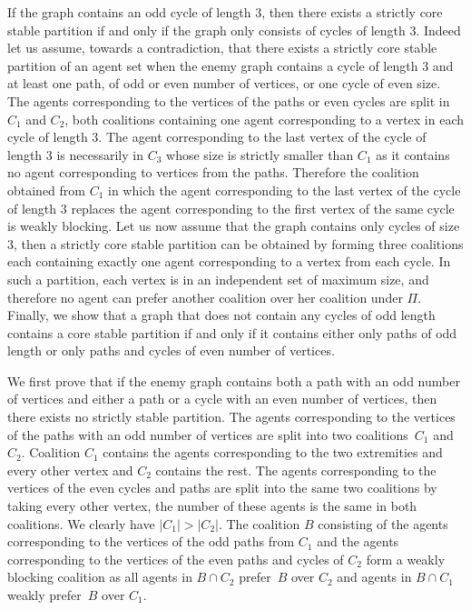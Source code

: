 \documentclass[a4paper,fleqn]{cas-sc}
\newcommand{\agent}{agent\xspace}
\newcommand{\agents}{agents\xspace}
\newcommand{\partition}{\ensuremath{\Pi}\xspace}
\newcommand{\coalition}{\ensuremath{C}\xspace}
\newcommand{\blockingCoalition}{\ensuremath{B}\xspace}
\begin{document}
{   If the graph contains an odd cycle of length $3$, then there exists a strictly core stable partition if and only if the graph only consists of cycles of length $3$. Indeed let us assume, towards a contradiction, that there exists a strictly core stable partition of an \agent set when the enemy graph contains a cycle of length $3$ and at least one path, of odd or even number of vertices, or one cycle of even size. The \agents corresponding to the vertices of the paths or even cycles are split in $\coalition_1$ and $\coalition_2$, both coalitions containing one \agent corresponding to a vertex in each cycle of length $3$. The \agent corresponding to the last vertex of the cycle of length $3$ is necessarily in $\coalition_3$ whose size is strictly smaller than $\coalition_1$ as it contains no \agent corresponding to vertices from the paths. Therefore the coalition obtained from $\coalition_1$ in which the \agent corresponding to the last vertex of the cycle of length $3$ replaces the \agent corresponding to the first vertex of the same cycle is weakly blocking. Let us now assume that the graph contains only cycles of size $3$, then a strictly core stable partition can be obtained by forming three coalitions each containing exactly one \agent corresponding to a vertex from each cycle. In such a partition, each vertex is in an independent set of maximum size, and therefore no \agent can prefer another coalition over her coalition under \partition.\\

   Finally, we show that a graph that does not contain any cycles of odd length contains a core stable partition if and only if it contains either only paths of odd length or only paths and cycles of even number of vertices. 
   
   We first prove that if the enemy graph contains both a path with an odd number of vertices and either a path or a cycle with an even number of vertices, then there exists no strictly stable partition. The \agents corresponding to the vertices of the paths with an odd number of vertices are split into two coalitions~$\coalition_1$ and~$\coalition_2$. Coalition $\coalition_1$ contains the \agents corresponding to the two extremities and every other vertex and $\coalition_2$ contains the rest. The \agents corresponding to the vertices of the even cycles and paths are split into the same two coalitions by taking every other vertex, the number of these \agents is the same in both coalitions. We clearly have $|\coalition_1|>|\coalition_2|$. 
   The coalition $\blockingCoalition$ consisting of the \agents corresponding to the vertices of the odd paths from $\coalition_1$ and the \agents corresponding to the vertices of the even paths and cycles of $\coalition_2$ form a weakly blocking coalition as all agents in $\blockingCoalition \cap \coalition_2$ prefer~\blockingCoalition over $\coalition_2$ and agents in $\blockingCoalition \cap \coalition_1$ weakly prefer~\blockingCoalition over $\coalition_1$. 
   
}
\end{document}
